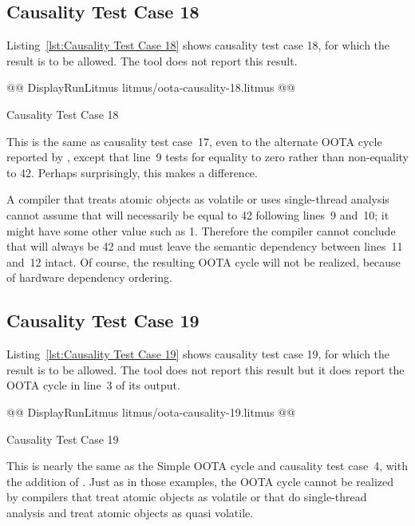 \documentclass[10]{article}
\begin{document}
\subsection{Causality Test Case 18}
\label{app:Causality Test Case 18}

Listing~\ref{lst:Causality Test Case 18}
shows causality test case 18, for which the 
result is to be allowed.
The  tool does not report this result.

\begin{listing}[tbp]
@@ DisplayRunLitmus litmus/oota-causality-18.litmus @@
\caption{Causality Test Case 18}
\label{lst:Causality Test Case 18}
\end{listing}

This is the same as causality test case~17, even to the alternate OOTA
cycle reported by , except that line~9 tests
 for equality to zero rather than non-equality to 42.
Perhaps surprisingly, this makes a difference.

A compiler that treats atomic objects as volatile or uses
single-thread analysis cannot assume that  will necessarily be
equal to 42 following lines~9 and~10; it might have some other value
such as 1.
Therefore the compiler cannot conclude that  will always be 42
and must leave the semantic dependency between lines~11 and~12 intact.
Of course, the resulting OOTA cycle will not be realized, because of
hardware dependency ordering.

\subsection{Causality Test Case 19}
\label{app:Causality Test Case 19}

Listing~\ref{lst:Causality Test Case 19}
shows causality test case 19, for which the 
result is to be allowed.
The  tool does not report this result but it does report the
OOTA cycle in line~3 of its output.

\begin{listing}[tbp]
@@ DisplayRunLitmus litmus/oota-causality-19.litmus @@
\caption{Causality Test Case 19}
\label{lst:Causality Test Case 19}
\end{listing}

This is nearly the same as the Simple OOTA cycle and causality test
case~4, with the addition of .
Just as in those examples, the OOTA cycle cannot be realized by
compilers that treat atomic objects as volatile or that do
single-thread analysis and treat atomic objects as quasi volatile.
\end{document}
